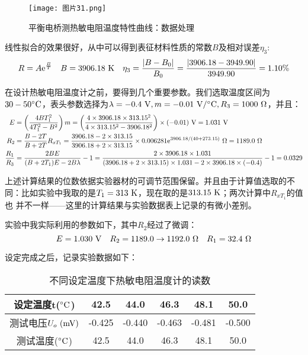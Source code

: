 \documentclass[11pt]{article}
\begin{document}
\begin{figure}[H]
    \centering
    \texttt{[image: 图片31.png]}
    \caption{平衡电桥测热敏电阻温度特性曲线：数据处理}
\end{figure}
线性拟合的效果很好，从中可以得到表征材料性质的常数$B$及相对误差$\eta_3$:
\[
  R= A \mathrm e^{\frac{B}{T}}\quad B=3906.18\,\,{\rm K}\quad \eta_3=\frac{|B-B_0|}{B_0}=\frac{|3906.18-3949.90|}{3949.90}=1.10\%
\]


在设计热敏电阻温度计之前，要得到几个重要参数。我们选取温度区间为$30-50^\circ\rm C$，表头参数选择为$\lambda=-0.4\,\,{\rm V},m=-0.01\,\,{\rm V/^\circ C},R_3=1000\,\,\Omega$，并且：
\begin{align*}
    E&=\left(\frac{4BT_1^2}{4T_1^2-B^2}\right)m=\left(\frac{4\times3906.18\times313.15^2}{4\times313.15^2-3906.18^2}\right)\times(-0.01)\,\, \rm V=1.031\,\,{\rm V}\\
    R_2&=\frac{B-2T}{B+2T}R_{xT_1}=\frac{3906.18-2\times313.15}{3906.18+2\times313.15}\times 0.006281\mathrm e^{3906.18/(40+273.15)}\,\,{\Omega}=1189.0\,\,{\rm \Omega}\\
     \frac{R_1}{R_3}&=\frac{2BE}{(B+2T_1)E-2B\lambda}-1=\frac{2\times3906.18\times 1.031}{(3906.18+2\times313.15)\times1.031-2\times3906.18\times(-0.4)}-1=0.0329
\end{align*}

上述计算结果的位数依据实验器材的可调节范围保留。并且由于计算值选取的不同：比如实验中我取的是$T_1=313\,\,\rm K$，现在取的是$313.15\,\,\rm K$；两次计算中$R_{xT_1}$的值也
并不一样——这里的计算结果与实验数据表上记录的有微小差别。

实验中我实际利用的参数如下，其中$R_2$经过了微调：
\[
  E=1.030\,\,{\rm V}\quad R_2=1189.0\to 1192.0 \,\,{\Omega } \quad R_1=32.4\,\,{\Omega}
\]











\newpage
设定完成之后，记录实验数据如下：

\begin{table}[H]
    \centering
    \caption{不同设定温度下热敏电阻温度计的读数}
    \begin{tabular}{cccccc}
        \toprule
        设定温度t($^\circ \rm C$) & 42.5  & 44.0  & 46.3  & 48.1  & 50.0  \\ 
        \midrule
        测试电压$U_o\,\,(\rm mV)$ & -0.425  & -0.440  & -0.463  & -0.481  & -0.500  \\ 
        测试温度($^\circ \rm C$) & 42.5  & 44.0  & 46.3  & 48.1  & 50.0 \\ 
        \bottomrule
    \end{tabular}
\end{table}
\end{document}
